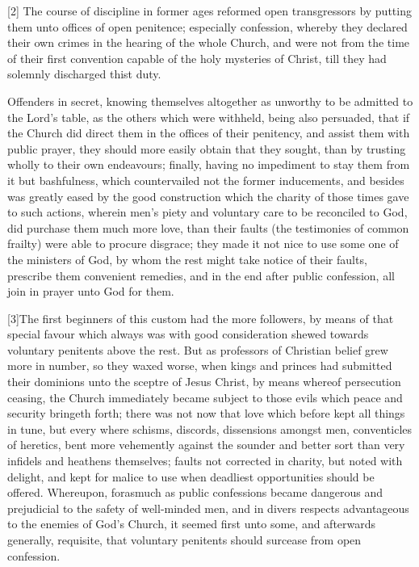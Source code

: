 [2] The course of discipline in former ages reformed open transgressors by putting them unto offices of open penitence; especially confession, whereby they declared their own crimes in the hearing of the whole Church, and were not from the time of their first convention capable of the holy mysteries of Christ, till they had solemnly discharged thist duty.

Offenders in secret, knowing themselves altogether as unworthy to be admitted to the Lord’s table, as the others which were withheld, being also persuaded, that if the Church did direct them in the offices of their penitency, and assist them with public prayer, they should more easily obtain that they sought, than by trusting wholly to their own endeavours; finally, having no impediment to stay them from it but bashfulness, which countervailed not the former inducements, and besides was greatly eased by the good construction which the charity of those times gave to such actions, wherein men’s piety and voluntary care to be reconciled to God, did purchase them much more love, than their faults (the testimonies of common frailty) were able to procure disgrace; they made it not nice to use some one of the ministers of God, by whom the rest might take notice of their faults, prescribe them convenient remedies, and in the end after public confession, all join in prayer unto God for them.

[3]The first beginners of this custom had the more followers, by means of that special favour which always was with good consideration shewed towards voluntary penitents above the rest. But as professors of Christian belief grew more in number, so they waxed worse, when kings and princes had submitted their dominions unto the sceptre of Jesus Christ, by means whereof persecution ceasing, the Church immediately became subject to those evils which peace and security bringeth forth; there was not now that love which before kept all things in tune, but every where schisms, discords, dissensions amongst men, conventicles of heretics, bent more vehemently against the sounder and better sort than very infidels and heathens themselves; faults not corrected in charity, but noted with delight, and kept for malice to use when deadliest opportunities should be offered. Whereupon, forasmuch as public confessions became dangerous and prejudicial to the safety of well-minded men, and in divers respects advantageous to the enemies of God’s Church, it seemed first unto some, and afterwards generally, requisite, that voluntary penitents should surcease from open confession.


